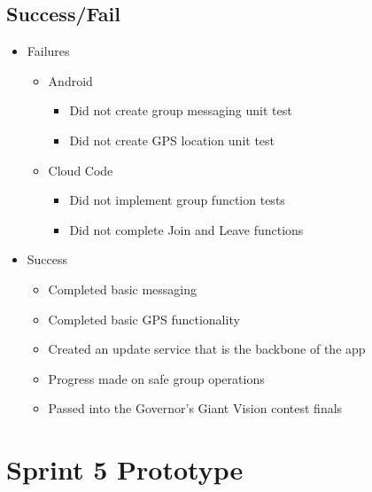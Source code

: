 \subsection{Success/Fail}
\begin{itemize}
	\item Failures
	\begin{itemize}
		\item Android
		\begin{itemize}
			\item Did not create group messaging unit test
			\item Did not create GPS location unit test
		\end{itemize}
		\item Cloud Code
		\begin{itemize}
			\item Did not implement group function tests
			\item Did not complete Join and Leave functions
		\end{itemize}
	\end{itemize}
	\item Success
	\begin{itemize}
		\item Completed basic messaging
		\item Completed basic GPS functionality
		\item Created an update service that is the backbone of the app
		\item Progress made on safe group operations
		\item Passed into the Governor's Giant Vision contest finals
	\end{itemize}
\end{itemize}

\section{Sprint 5 Prototype}

